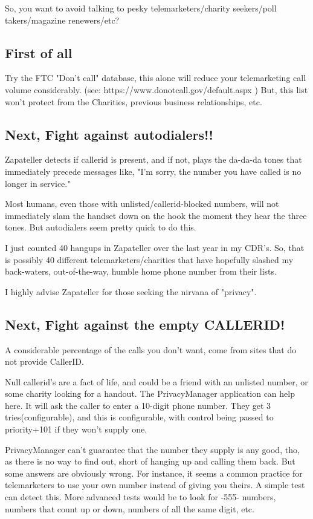 So, you want to avoid talking to pesky telemarketers/charity
seekers/poll takers/magazine renewers/etc?

\subsection{First of all}

Try the FTC "Don't call" database, this alone will reduce your
telemarketing call volume considerably.  (see:
https://www.donotcall.gov/default.aspx ) But, this list won't protect
from the Charities, previous business relationships, etc.

\subsection{Next, Fight against autodialers!!}

Zapateller detects if callerid is present, and if not, plays the
da-da-da tones that immediately precede messages like, "I'm sorry,
the number you have called is no longer in service."

Most humans, even those with unlisted/callerid-blocked numbers, will
not immediately slam the handset down on the hook the moment they hear
the three tones. But autodialers seem pretty quick to do this.

I just counted 40 hangups in Zapateller over the last year in my
CDR's.  So, that is possibly 40 different telemarketers/charities that have
hopefully slashed my back-waters, out-of-the-way, humble home phone
number from their lists.

I highly advise Zapateller for those seeking the nirvana of "privacy".


\subsection{Next, Fight against the empty CALLERID!}

A considerable percentage of the calls you don't want, come from
sites that do not provide CallerID. 

Null callerid's are a fact of life, and could be a friend with an
unlisted number, or some charity looking for a handout. The
PrivacyManager application can help here. It will ask the caller to
enter a 10-digit phone number. They get 3 tries(configurable), and this is
configurable, with control being passed to priority+101 if they won't
supply one.

PrivacyManager can't guarantee that the number they supply is any
good, tho, as there is no way to find out, short of hanging up and
calling them back. But some answers are obviously wrong. For instance,
it seems a common practice for telemarketers to use your own number
instead of giving you theirs. A simple test can detect this. More
advanced tests would be to look for -555- numbers, numbers that count
up or down, numbers of all the same digit, etc.

